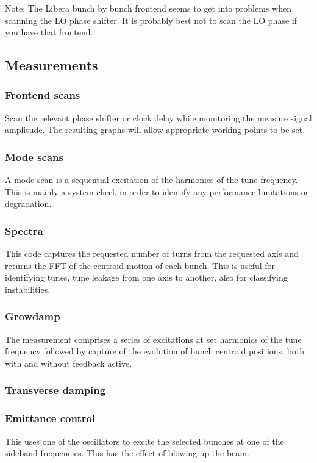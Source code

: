 \documentclass{report}
\begin{document}
Note: The Libera bunch by bunch frontend seems to get into problems when scanning the LO phase shifter. It is probably best not to scan the LO phase if you have that frontend.
\clearpage
\subsection{Measurements}
\subsubsection{Frontend scans}
Scan the relevant phase shifter or clock delay while monitoring the measure signal amplitude. The resulting graphs will allow appropriate working points to be set.

\subsubsection{Mode scans}
A mode scan is a sequential excitation of the harmonics of the tune frequency. This is mainly a system check in order to identify any performance limitations or degradation.

\subsubsection{Spectra}
This code captures the requested number of turns from the requested axis and returns the FFT of the centroid motion of each bunch. This is useful for identifying tunes, tune leakage from one axis to another, also for classifying instabilities.

\subsubsection{Growdamp}
The measurement comprises a series of excitations at set harmonics of the tune frequency followed by capture of the evolution of bunch centroid positions, both with and without feedback active.

\subsubsection{Transverse damping}

\subsubsection{Emittance control}
This uses one of the oscillators to excite the selected bunches at one of the sideband frequencies. This has the effect of blowing up the beam.
\end{document}
